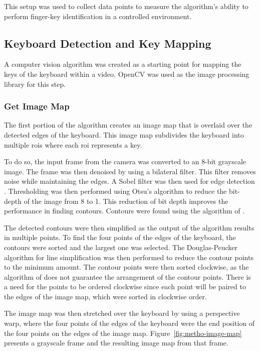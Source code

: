 \documentclass[preprint,12pt,authoryear]{elsarticle}
\begin{document}
This setup was used to collect data points to measure the algorithm's ability to
perform finger-key identification in a controlled environment.


\subsection{Keyboard Detection and Key Mapping}
\label{section:metho-algo-keyboard}

A computer vision algorithm was created as a starting point for mapping the keys
of the keyboard within a video. OpenCV \citep{opencv} was used as the image
processing library for this step.

\subsubsection{Get Image Map}
The first portion of the algorithm creates an image map that is overlaid over
the detected edges of the keyboard. This image map subdivides the keyboard into
multiple \acp{roi} where each \ac{roi} represents a key.

To do so, the input frame from the camera was converted to an 8-bit grayscale
image. The frame was then denoised by using a bilateral filter. This filter
removes noise while maintaining the edges. A Sobel filter was then used for edge
detection \citep{sobel2014}. Thresholding was then performed using Otsu's
algorithm \citep{otsu} to reduce the bit-depth of the image from 8 to 1. This
reduction of bit depth improves the performance in finding contours. Contours
were found using the algorithm of \citet{contours}.

The detected contours were then simplified as the output of the algorithm
results in multiple points. To find the four points of the edges of the
keyboard, the contours were sorted and the largest one was selected. The
Douglas-Peucker algorithm for line simplification \citet{douglas-peucker} was
then performed to reduce the contour points to the minimum amount. The contour
points were then sorted clockwise, as the algorithm of \citet{contours} does not
guarantee the arrangement of the contour points. There is a need for the points
to be ordered clockwise since each point will be paired to the edges of the
image map, which were sorted in clockwise order.

The image map was then stretched over the keyboard by using a perspective warp,
where the four points of the edges of the keyboard were the end position of the
four points on the edges of the image map. Figure~\ref{fig:metho-image-map}
presents a grayscale frame and the resulting image map from that frame.
\end{document}
